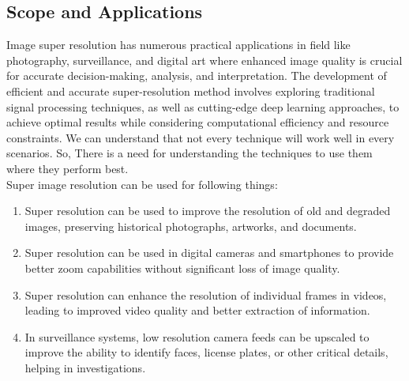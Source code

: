 \subsection{Scope and Applications}
Image super resolution has numerous practical applications in field
like photography, surveillance, and digital art where enhanced image quality is crucial
for accurate decision-making, analysis, and interpretation. The development of efficient
and accurate super-resolution method involves exploring traditional signal processing
techniques, as well as cutting-edge deep learning approaches, to achieve optimal results
while considering computational efficiency and resource constraints. We can understand that not every technique will work well in every scenarios. So, There is a need for understanding the techniques to use them where they perform best.\\
Super image resolution can be used for following things: 
\begin{enumerate}
    \item Super resolution can be used to improve the resolution of old and degraded
    images, preserving historical photographs, artworks, and documents. 
    \item Super resolution can be used in digital cameras and smartphones to provide
    better zoom capabilities without significant loss of image quality.
    \item Super resolution can enhance the resolution of individual frames in videos,
    leading to improved video quality and better extraction of information. 
    \item In surveillance systems, low resolution camera feeds can be upscaled to improve
    the ability to identify faces, license plates, or other critical details, helping in
    investigations. 
    
\end{enumerate}
